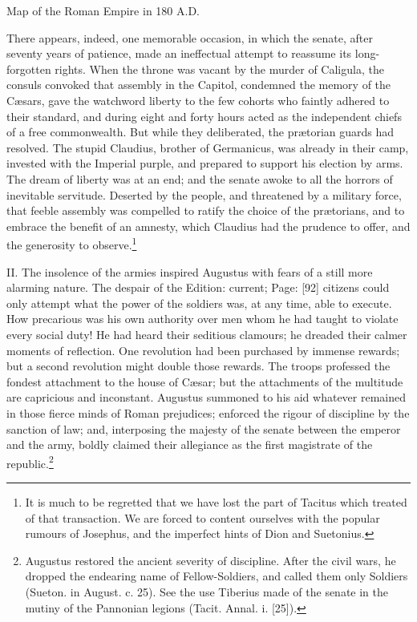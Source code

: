 Map of the Roman Empire in 180 A.D.

There appears, indeed, one memorable occasion, in which the senate, after seventy years of patience, made an ineffectual attempt to reassume its long-forgotten rights. When the throne was vacant by the murder of Caligula, the consuls convoked that assembly in the Capitol, condemned the memory of the Cæsars, gave the watchword liberty to the few cohorts who faintly adhered to their standard, and during eight and forty hours acted as the independent chiefs of a free commonwealth. But while they deliberated, the prætorian guards had resolved. The stupid Claudius, brother of Germanicus, was already in their camp, invested with the Imperial purple, and prepared to support his election by arms. The dream of liberty was at an end; and the senate awoke to all the horrors of inevitable servitude. Deserted by the people, and threatened by a military force, that feeble assembly was compelled to ratify the choice of the prætorians, and to embrace the benefit of an amnesty, which Claudius had the prudence to offer, and the generosity to observe.\footnote{It is much to be regretted that we have lost the part of Tacitus which treated of that transaction. We are forced to content ourselves with the popular rumours of Josephus, and the imperfect hints of Dion and Suetonius.}

II. The insolence of the armies inspired Augustus with fears of a still more alarming nature. The despair of the Edition: current; Page: [92] citizens could only attempt what the power of the soldiers was, at any time, able to execute. How precarious was his own authority over men whom he had taught to violate every social duty! He had heard their seditious clamours; he dreaded their calmer moments of reflection. One revolution had been purchased by immense rewards; but a second revolution might double those rewards. The troops professed the fondest attachment to the house of Cæsar; but the attachments of the multitude are capricious and inconstant. Augustus summoned to his aid whatever remained in those fierce minds of Roman prejudices; enforced the rigour of discipline by the sanction of law; and, interposing the majesty of the senate between the emperor and the army, boldly claimed their allegiance as the first magistrate of the republic.\footnote{Augustus restored the ancient severity of discipline. After the civil wars, he dropped the endearing name of Fellow-Soldiers, and called them only Soldiers (Sueton. in August. c. 25). See the use Tiberius made of the senate in the mutiny of the Pannonian legions (Tacit. Annal. i. [25]).}


